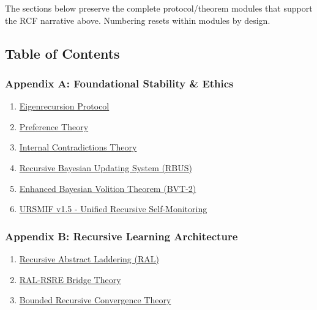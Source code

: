 \documentclass[
]{article}
\providecommand{\tightlist}{%
  \setlength{\itemsep}{0pt}\setlength{\parskip}{0pt}}
\begin{document}
The sections below preserve the complete protocol/theorem modules that
support the RCF narrative above. Numbering resets within modules by
design.

\subsection{Table of Contents}\label{table-of-contents}

\subsubsection{Appendix A: Foundational Stability \&
Ethics}\label{appendix-a-foundational-stability-ethics}

\begin{enumerate}
\def\labelenumi{\arabic{enumi}.}
\tightlist
\item
  \hyperref[1-eigenrecursion-protocol]{Eigenrecursion Protocol}
\item
  \hyperref[2-preference-theory]{Preference Theory}
\item
  \hyperref[3-internal-contradictions-theory]{Internal Contradictions
  Theory}
\item
  \hyperref[4-recursive-bayesian-updating-system]{Recursive Bayesian
  Updating System (RBUS)}
\item
  \hyperref[5-enhanced-bayesian-volition-theorem]{Enhanced Bayesian
  Volition Theorem (BVT-2)}
\item
  \hyperref[6-ursmif-v15]{URSMIF v1.5 - Unified Recursive
  Self-Monitoring}
\end{enumerate}

\subsubsection{Appendix B: Recursive Learning
Architecture}\label{appendix-b-recursive-learning-architecture}

\begin{enumerate}
\def\labelenumi{\arabic{enumi}.}
\setcounter{enumi}{6}
\tightlist
\item
  \hyperref[7-recursive-abstract-laddering]{Recursive Abstract Laddering
  (RAL)}
\item
  \hyperref[8-ral-rsre-bridge-theory]{RAL-RSRE Bridge Theory}
\item
  \hyperref[9-bounded-recursive-convergence-theory]{Bounded Recursive
  Convergence Theory}
\end{enumerate}
\end{document}
